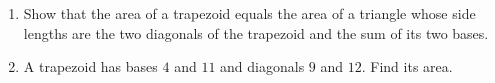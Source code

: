 \begin{enumerate}
\item[(a)] Show that the area of a trapezoid equals the area of a triangle whose side lengths are the two diagonals of the trapezoid and the sum of its two bases.
\item[(b)] A trapezoid has bases $4$ and $11$ and diagonals $9$ and $12$. Find its area.
\end{enumerate}
